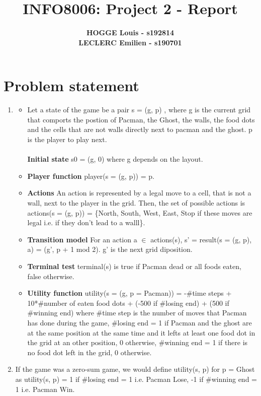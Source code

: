 \documentclass{article}
\begin{document}

\title{\Large{INFO8006: Project 2 - Report}}
\vspace{1cm}
\author{\small{\bf HOGGE Louis - s192814} \\ \small{\bf LECLERC Emilien - s190701}}

\maketitle


\section{Problem statement}

\begin{enumerate}[label=\alph*.,leftmargin=*]
    \item
    \begin{itemize}
        \item Let a state of the game be a pair s = (g, p) , where g is the current grid that comports the postion of Pacman, the Ghost, the walls, the food dots and the cells that are not walls directly next to pacman and the ghost. p is the player to play next.
        \\
        \\
        \textbf{Initial state} s0 = (g, 0) where g depends on the layout. 
        \item \textbf{Player function} player(s = (g, p)) = p.
        \item \textbf{Actions}  An action is represented by a legal move to a cell, that is not a wall, next to the player in the grid. Then, the set of possible actions is actions(s = (g, p)) = \{North, South, West, East, Stop if these moves are legal i.e. if they don't lead to a walll\}.
        \item \textbf{Transition model} For an action a $\in$ actions(s),
s' = result(s = (g, p), a) = (g', p + 1 mod 2). g' is the next grid diposition.
        \item \textbf{Terminal test} terminal(s) is true if Pacman dead or all foods eaten, false otherwise.
        \item \textbf{Utility function} utility(s = (g, p = Pacman)) = -\#time steps + 10*\#number of eaten food dots + (-500 if \#losing end) + (500 if \#winning end) where \#time step is the number of moves that Pacman has done during the game, \#losing end = 1 if Pacman and the ghost are at the same position at the same time and it lefts at least one food dot in the grid at an other position, 0 otherwise, \#winning end = 1 if there is no food dot left in the grid, 0 otherwise.
    \end{itemize}
    \item If the game was a zero-sum game, we would define utility(s, p) for p = Ghost as utility(s, p) = 1 if  \#losing end = 1 i.e. Pacman Lose, -1 if \#winning end = 1 i.e. Pacman Win.

\end{enumerate}
\end{document}
